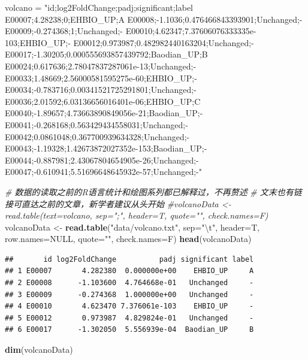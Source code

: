 \documentclass[]{article}
\newenvironment{Shaded}{\begin{snugshade}}{\end{snugshade}}
\newcommand{\KeywordTok}[1]{\textcolor[rgb]{0.13,0.29,0.53}{\textbf{{#1}}}}
\newcommand{\DataTypeTok}[1]{\textcolor[rgb]{0.13,0.29,0.53}{{#1}}}
\newcommand{\CharTok}[1]{\textcolor[rgb]{0.31,0.60,0.02}{{#1}}}
\newcommand{\StringTok}[1]{\textcolor[rgb]{0.31,0.60,0.02}{{#1}}}
\newcommand{\CommentTok}[1]{\textcolor[rgb]{0.56,0.35,0.01}{\textit{{#1}}}}
\newcommand{\OtherTok}[1]{\textcolor[rgb]{0.56,0.35,0.01}{{#1}}}
\newcommand{\NormalTok}[1]{{#1}}
\numberwithin{figure}{section}
\numberwithin{table}{section}
\theoremstyle{definition}
\theoremstyle{definition}
\theoremstyle{definition}
\theoremstyle{remark}
\begin{document}
\begin{Shaded}
\begin{Highlighting}[]
\NormalTok{volcano =}\StringTok{ "id;log2FoldChange;padj;significant;label}
\StringTok{E00007;4.28238;0;EHBIO_UP;A}
\StringTok{E00008;-1.1036;0.476466843393901;Unchanged;-}
\StringTok{E00009;-0.274368;1;Unchanged;-}
\StringTok{E00010;4.62347;7.37606076333335e-103;EHBIO_UP;-}
\StringTok{E00012;0.973987;0.482982440163204;Unchanged;-}
\StringTok{E00017;-1.30205;0.000555693857439792;Baodian_UP;B}
\StringTok{E00024;0.617636;2.78047837287061e-13;Unchanged;-}
\StringTok{E00033;1.48669;2.56000581595275e-60;EHBIO_UP;-}
\StringTok{E00034;-0.783716;0.00341521725291801;Unchanged;-}
\StringTok{E00036;2.01592;6.03136656016401e-06;EHBIO_UP;C}
\StringTok{E00040;-1.89657;4.73663890849056e-21;Baodian_UP;-}
\StringTok{E00041;-0.268168;0.563429434558031;Unchanged;-}
\StringTok{E00042;0.0861048;0.367700939634328;Unchanged;-}
\StringTok{E00043;-1.19328;1.42673872027352e-153;Baodian_UP;-}
\StringTok{E00044;-0.887981;2.43067804654905e-26;Unchanged;-}
\StringTok{E00047;-0.610941;5.51696648645932e-57;Unchanged;-"}

\CommentTok{# 数据的读取之前的R语言统计和绘图系列都已解释过，不再赘述}
\CommentTok{# 文末也有链接可直达之前的文章，新学者建议从头开始}
\CommentTok{#volcanoData <- read.table(text=volcano, sep=";", header=T, quote="", check.names=F)}
\NormalTok{volcanoData <-}\StringTok{ }\KeywordTok{read.table}\NormalTok{(}\StringTok{"data/volcano.txt"}\NormalTok{, }\DataTypeTok{sep=}\StringTok{"}\CharTok{\textbackslash{}t}\StringTok{"}\NormalTok{, }\DataTypeTok{header=}\NormalTok{T, }
                          \DataTypeTok{row.names=}\OtherTok{NULL}\NormalTok{, }\DataTypeTok{quote=}\StringTok{""}\NormalTok{, }\DataTypeTok{check.names=}\NormalTok{F)}
\KeywordTok{head}\NormalTok{(volcanoData)}
\end{Highlighting}
\end{Shaded}

\begin{verbatim}
##       id log2FoldChange          padj significant label
## 1 E00007       4.282380  0.000000e+00    EHBIO_UP     A
## 2 E00008      -1.103600  4.764668e-01   Unchanged     -
## 3 E00009      -0.274368  1.000000e+00   Unchanged     -
## 4 E00010       4.623470 7.376061e-103    EHBIO_UP     -
## 5 E00012       0.973987  4.829824e-01   Unchanged     -
## 6 E00017      -1.302050  5.556939e-04  Baodian_UP     B
\end{verbatim}

\begin{Shaded}
\begin{Highlighting}[]
\KeywordTok{dim}\NormalTok{(volcanoData)}
\end{Highlighting}
\end{Shaded}
\end{document}
